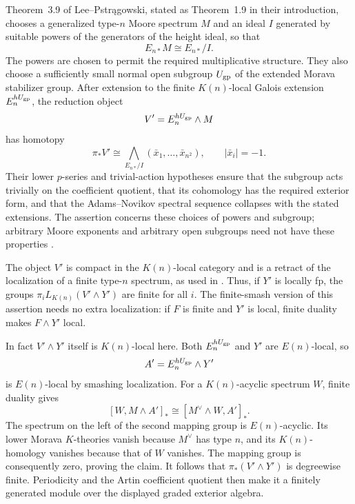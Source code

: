 \begin{remark}
\label{scope:local-reductions}
Theorem~3.9 of Lee--Pstr{\k a}gowski, stated as Theorem~1.9 in their
introduction, chooses a generalized type-\(n\) Moore spectrum \(M\)
and an ideal \(I\) generated by suitable powers of the generators of
the height ideal, so that
\[
 E_{n*}M\cong E_{n*}/I.
\]
The powers are chosen to permit the required multiplicative
structure.  They also choose a sufficiently small normal open subgroup
\(U_{\rm gp}\) of the extended Morava stabilizer group.  After
extension to the finite \(K(n)\)-local Galois extension
\(E_n^{hU_{\rm gp}}\), the reduction object
\[
 V'=E_n^{hU_{\rm gp}}\wedge M
\]
has homotopy
\[
 \pi_*V'
   \cong\bigwedge_{E_{n*}/I}
           (\bar x_1,\ldots,\bar x_{n^2}),
 \qquad |\bar x_i|=-1.
\]
Their lower \(p\)-series and trivial-action hypotheses ensure that
the subgroup acts trivially on the coefficient quotient, that its
cohomology has the required exterior form, and that the
Adams--Novikov spectral sequence collapses with the stated extensions.
The assertion concerns these choices of powers and subgroup; arbitrary
Moore exponents and arbitrary open subgroups need not have these
properties \cite[Section~3 and Theorem~3.9]{LP2026}.

The object \(V'\) is compact in the \(K(n)\)-local category and is
a retract of the localization of a finite type-\(n\) spectrum, as
used in \cite[Notation~4.6]{LP2026}.  Thus, if \(Y'\) is locally
fp, the groups
\(\pi_iL_{K(n)}(V'\wedge Y')\) are finite for all \(i\).  The
finite-smash version of this assertion needs no extra localization:
if \(F\) is finite and \(Y'\) is local, finite duality makes
\(F\wedge Y'\) local.

In fact \(V'\wedge Y'\) itself is \(K(n)\)-local here.  Both
\(E_n^{hU_{\rm gp}}\) and \(Y'\) are \(E(n)\)-local, so
\[
 A'=E_n^{hU_{\rm gp}}\wedge Y'
\]
is \(E(n)\)-local by smashing localization.  For a
\(K(n)\)-acyclic spectrum \(W\), finite duality gives
\[
 [W,M\wedge A']_*
     \cong[M^\vee\wedge W,A']_*.
\]
The spectrum on the left of the second mapping group is
\(E(n)\)-acyclic.  Its lower Morava \(K\)-theories vanish because
\(M^\vee\) has type \(n\), and its \(K(n)\)-homology vanishes
because that of \(W\) vanishes.  The mapping group is consequently
zero, proving the claim.  It follows that
\(\pi_*(V'\wedge Y')\) is degreewise finite.  Periodicity and the
Artin coefficient quotient then make it a finitely generated module
over the displayed graded exterior algebra.
\end{remark}

